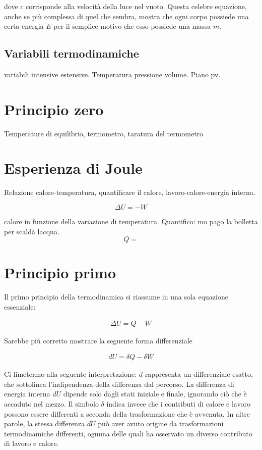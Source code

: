 \noindent dove $c$ corrisponde alla velocità della luce nel vuoto.
Questa celebre equazione, anche se più complessa di quel che
sembra, mostra che ogni corpo possiede una certa energia $E$ per il semplice
motivo che esso possiede una massa $m$.

\subsection{Variabili termodinamiche}
variabili intensive estensive. Temperatura pressione volume. Piano pv.

\section{Principio zero}
Temperature di equilibrio, termometro, taratura del termometro

\section{Esperienza di Joule}
Relazione calore-temperatura, quantificare il calore, lavoro-calore-energia interna.

\[ \Delta U = -W \]

calore in funzione della variazione di temperatura. Quantifico: mo pago
la bolletta per scaldà lacqua.
\[ Q =  \]


\section{Principio primo}
Il primo principio della termodinamica si riassume in una sola
equazione essenziale:

\begin{align}
    \Delta U = Q - W
\end{align}

\noindent Sarebbe più corretto mostrare la seguente forma differenziale

\begin{tcolorbox}[colback = red!30, colframe = red!30!black, title = {Primo principio della termodinamica}]
\begin{align}
    dU = \delta Q - \delta W
\end{align}
\end{tcolorbox}

\noindent Ci limetermo alla seguente interpretazione: $d$ rappresenta
un differenziale esatto, che sottolinea l'indipendenza della differenza
dal percorso. La differenza di energia interna $dU$ dipende solo dagli
stati iniziale e finale, ignorando ciò che è accaduto nel mezzo.
Il simbolo $\delta$ indica invece che i contributi di calore e lavoro
possono essere differenti a seconda della trasformazione che è
avvenuta. In altre parole, la stessa differenza $dU$ può aver
avuto origine da trasformazioni termodinamiche differenti, ognuna
delle quali ha osservato un diverso contributo di lavoro e calore.

